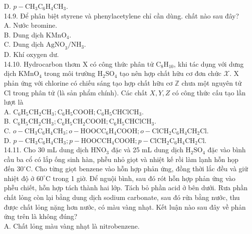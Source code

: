 \documentclass[10pt]{article}
\begin{document}
D. $p-\mathrm{CH}_{3} \mathrm{C}_{6} \mathrm{H}_{4} \mathrm{CH}_{3}$.\\
14.9. Để phân biệt styrene và phenylacetylene chỉ cần dùng. chất nào sau đây?\\
A. Nước bromine.\\
B. Dung dịch $\mathrm{KMnO}_{4}$.\\
C. Dung dịch $\mathrm{AgNO}_{3} / \mathrm{NH}_{3}$.\\
D. Khí oxygen dư.\\
14.10. Hydrocarbon thơm X có công thức phân tử $\mathrm{C}_{8} \mathrm{H}_{10}$, khi tác dụng với dưng dịch $\mathrm{KMnO}_{4}$ trong môi trường $\mathrm{H}_{2} \mathrm{SO}_{4}$ tạo nên hợp chất hữu cơ đơn chức $\mathcal{X}$. X phản ứng với chlorine có chiếu sáng tạo hợp chất hữu cơ $\mathbb{Z}$ chưa một nguyên tử Cl trong phân tử (là sản phẩm chính). Các chất $X, Y, Z$ có công thức cấu tạo lần lượt là\\
A. $\mathrm{C}_{6} \mathrm{H}_{5} \mathrm{CH}_{2} \mathrm{CH}_{3} ; \mathrm{C}_{6} \mathrm{H}_{5} \mathrm{COOH} ; \mathrm{C}_{6} \mathrm{H}_{5} \mathrm{CHClCH}_{3}$.\\
B. $\mathrm{C}_{6} \mathrm{H}_{5} \mathrm{CH}_{2} \mathrm{CH}_{3} ; \mathrm{C}_{6} \mathrm{H}_{5} \mathrm{CH}_{2} \mathrm{COOH} ; \mathrm{C}_{6} \mathrm{H}_{5} \mathrm{CHClCH}_{3}$.\\
C. $o-\mathrm{CH}_{3} \mathrm{C}_{6} \mathrm{H}_{4} \mathrm{CH}_{3} ; o-\mathrm{HOOCC}_{6} \mathrm{H}_{4} \mathrm{COOH} ; o-\mathrm{ClCH}_{2} \mathrm{C}_{6} \mathrm{H}_{4} \mathrm{CH}_{2} \mathrm{Cl}$.\\
D. $p-\mathrm{CH}_{3} \mathrm{C}_{6} \mathrm{H}_{4} \mathrm{CH}_{3} ; p-\mathrm{HOOCC} \mathrm{H}_{4} \mathrm{COOH} ; p-\mathrm{ClCH}_{2} \mathrm{C}_{6} \mathrm{H}_{4} \mathrm{CH}_{2} \mathrm{Cl}$.\\
14.11. Cho 30 mL dung dịch $\mathrm{HNO}_{3}$ đặc và 25 mL dung dịch $\mathrm{H}_{2} \mathrm{SO}_{4}$ đặc vào bình cầu ba cổ có lắp ống sinh hàn, phễu nhỏ giọt và nhiệt kế rồi làm lạnh hỗn họp đến $30^{\circ} \mathrm{C}$. Cho từng giọt benzene vào hỗn hợp phản ứng, đồng thời lắc đều và giữ nhiệt độ ở $60^{\circ} \mathrm{C}$ trong 1 giờ. Để nguội bình, sau đó rót hỗn hợp phản ứng vào phễu chiết, hỗn hợp tách thành hai lớp. Tách bỏ phần acid ở bên dưới. Rưa phần chất lỏng còn lại bằng dung dịch sodium carbonate, sau đó rửa bằng nước, thu được chất lỏng nặng hơn nước, có màu vàng nhạt. Kết luận nào sau đây về phản ứng trên là không đúng?\\
A. Chất lỏng màu vàng nhạt là nitrobenzene.\\
\end{document}
